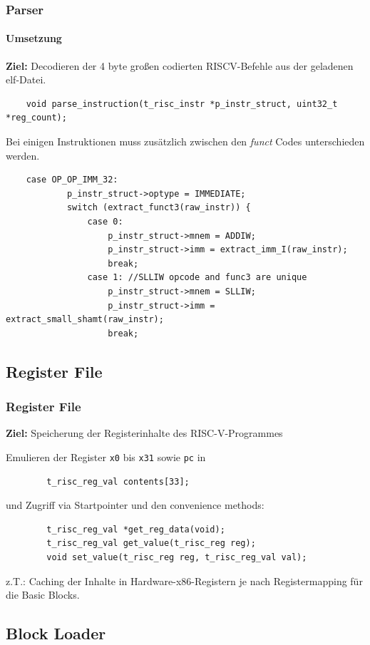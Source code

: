 \documentclass[german]{tum-presentation}
\begin{document}
\begin{frame}[fragile]
	\frametitle{Parser}
	\framesubtitle{Umsetzung}
	\textbf{Ziel:} Decodieren der 4 byte großen codierten RISCV-Befehle aus der geladenen elf-Datei.
	\begin{lstlisting}
	void parse_instruction(t_risc_instr *p_instr_struct, uint32_t *reg_count);
	\end{lstlisting}
	Bei einigen Instruktionen muss zusätzlich zwischen den \textit{funct} Codes unterschieden werden.
	\begin{lstlisting}
    case OP_OP_IMM_32:
            p_instr_struct->optype = IMMEDIATE;
            switch (extract_funct3(raw_instr)) {
                case 0:
                    p_instr_struct->mnem = ADDIW;
                    p_instr_struct->imm = extract_imm_I(raw_instr);
                    break;
                case 1: //SLLIW opcode and func3 are unique
                    p_instr_struct->mnem = SLLIW;
                    p_instr_struct->imm = extract_small_shamt(raw_instr);
                    break;
	\end{lstlisting}
\end{frame}



\subsection{Register File} %
\begin{frame}[fragile]
	\frametitle{Register File}
	\textbf{Ziel:} Speicherung der Registerinhalte des RISC-V-Programmes
	
	\vspace{1cm}
	\pause
	Emulieren der Register \verb!x0! bis \verb!x31! sowie \verb!pc! in
	\begin{lstlisting}
		t_risc_reg_val contents[33];
	\end{lstlisting}
	
	\pause
	und Zugriff via Startpointer und den convenience methods:
	
	\begin{lstlisting}
		t_risc_reg_val *get_reg_data(void);
		t_risc_reg_val get_value(t_risc_reg reg);
		void set_value(t_risc_reg reg, t_risc_reg_val val);
	\end{lstlisting}
	
	z.T.: Caching der Inhalte in Hardware-x86-Registern je nach Registermapping für die Basic Blocks.
\end{frame}

\subsection{Block Loader} %
\end{document}
